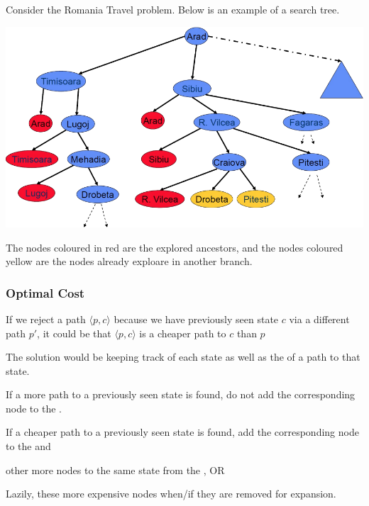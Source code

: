 \begin{example}
    Consider the Romania Travel problem. Below is an example of a search tree. 

    \begin{center}
        \includegraphics[width=0.67\linewidth]{figures/cycle-checking.png}
    \end{center}

    The nodes coloured in red are the explored ancestors, and the nodes coloured yellow are the nodes already exploare in another branch.
\end{example}

\subsubsection{Optimal Cost}

If we reject a path $\langle p, c \rangle$ because we have previously seen state $c$ via a different path $p'$, it could be that $\langle p, c \rangle$ is a cheaper path to $c$ than $p$

The solution would be keeping track of each state as well as the  of a path to that state. 

\begin{listu}
    \item If a more  path to a previously seen state is found, do not add the corresponding node to the \Frontier.
    \item If a cheaper path to a previously seen state is found, add the corresponding node to the \Frontier and
    \begin{listu}
        \item {} other more  nodes to the same state from the \Frontier, OR
        \item Lazily,  these more expensive nodes when/if they are removed for expansion.
    \end{listu}
\end{listu}

